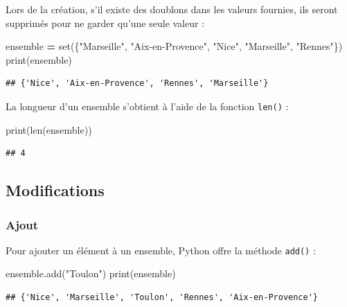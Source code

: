 \documentclass[12pt,]{book}
\newenvironment{Shaded}{\begin{snugshade}}{\end{snugshade}}
\newcommand{\StringTok}[1]{\textcolor[rgb]{0.31,0.60,0.02}{#1}}
\newcommand{\OperatorTok}[1]{\textcolor[rgb]{0.81,0.36,0.00}{\textbf{#1}}}
\newcommand{\BuiltInTok}[1]{#1}
\newcommand{\NormalTok}[1]{#1}
\numberwithin{equation}{section}
\numberwithin{countremarque}{section}
\begin{document}
Lors de la création, s'il existe des doublons dans les valeurs fournies,
ils seront supprimés pour ne garder qu'une seule valeur :

\begin{Shaded}
\begin{Highlighting}[]
\NormalTok{ensemble }\OperatorTok{=} \BuiltInTok{set}\NormalTok{(\{}\StringTok{"Marseille"}\NormalTok{, }\StringTok{"Aix-en-Provence"}\NormalTok{, }\StringTok{"Nice"}\NormalTok{, }\StringTok{"Marseille"}\NormalTok{, }\StringTok{"Rennes"}\NormalTok{\})}
\BuiltInTok{print}\NormalTok{(ensemble)}
\end{Highlighting}
\end{Shaded}

\begin{lstlisting}
## {'Nice', 'Aix-en-Provence', 'Rennes', 'Marseille'}
\end{lstlisting}

La longueur d'un ensemble s'obtient à l'aide de la fonction
\texttt{len()} :

\begin{Shaded}
\begin{Highlighting}[]
\BuiltInTok{print}\NormalTok{(}\BuiltInTok{len}\NormalTok{(ensemble))}
\end{Highlighting}
\end{Shaded}

\begin{lstlisting}
## 4
\end{lstlisting}

\subsection{Modifications}\label{modifications}

\subsubsection{Ajout}\label{ajout}

Pour ajouter un élément à un ensemble, Python offre la méthode
\texttt{add()} :

\begin{Shaded}
\begin{Highlighting}[]
\NormalTok{ensemble.add(}\StringTok{"Toulon"}\NormalTok{)}
\BuiltInTok{print}\NormalTok{(ensemble)}
\end{Highlighting}
\end{Shaded}

\begin{lstlisting}
## {'Nice', 'Marseille', 'Toulon', 'Rennes', 'Aix-en-Provence'}
\end{lstlisting}
\end{document}
